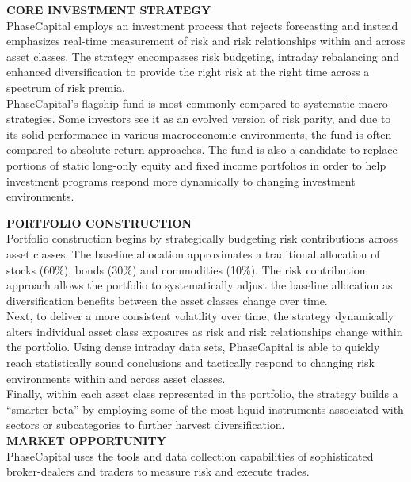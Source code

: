 \documentclass[9pt]{article}
\begin{document}
\textbf{\textcolor{phaseGold}{CORE INVESTMENT STRATEGY}} \\
PhaseCapital employs an investment process that rejects forecasting and instead
emphasizes real-time measurement of risk and risk relationships within and
across asset classes. The strategy encompasses risk budgeting, intraday
rebalancing and enhanced diversification to provide the right risk at the
right time across a spectrum of risk premia. \\

PhaseCapital's flagship fund is most commonly compared to systematic macro
strategies. Some investors see it as an evolved version of risk parity, and
due to its solid performance in various macroeconomic environments, the fund is
often compared to absolute return approaches. The fund is also a candidate to
replace portions of static long-only equity and fixed income portfolios in
order to help investment programs respond more dynamically to changing
investment environments. \\

\newpage
\onecolumn

\textbf{\textcolor{phaseGold}{PORTFOLIO CONSTRUCTION}} \\
Portfolio construction begins by strategically budgeting risk
contributions across asset classes. The baseline allocation approximates a
traditional allocation of stocks (60\%), bonds (30\%) and commodities (10\%).
The risk contribution approach allows the portfolio to systematically adjust
the baseline allocation as diversification benefits between the asset classes
change over time. \\

Next, to deliver a more consistent volatility over time, the strategy
dynamically alters individual asset class exposures as risk and risk relationships
change within the portfolio. Using dense intraday data sets, PhaseCapital is
able to quickly reach statistically sound conclusions and tactically respond to
changing risk environments within and across asset classes. \\

Finally, within each asset class represented in the portfolio, the
strategy builds a ``smarter beta'' by employing some of the most liquid instruments
associated with sectors or subcategories to further harvest diversification. \\

\textbf{\textcolor{phaseGold}{MARKET OPPORTUNITY}} \\
PhaseCapital uses the tools and data collection capabilities of sophisticated
broker-dealers and traders to measure risk and execute trades. \\
\end{document}

